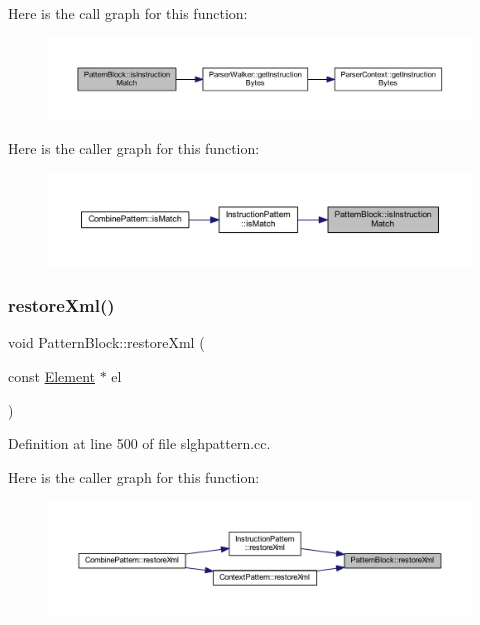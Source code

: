 Here is the call graph for this function\+:
\nopagebreak
\begin{figure}[H]
\begin{center}
\leavevmode
\includegraphics[width=350pt]{class_pattern_block_a64c44360ffff4e4b508d5b1ac0f7b9a2_cgraph}
\end{center}
\end{figure}
Here is the caller graph for this function\+:
\nopagebreak
\begin{figure}[H]
\begin{center}
\leavevmode
\includegraphics[width=350pt]{class_pattern_block_a64c44360ffff4e4b508d5b1ac0f7b9a2_icgraph}
\end{center}
\end{figure}
\mbox{\label{class_pattern_block_aa4465b1b7c1fa2f15d04ac74be36b21f}} 
\subsubsection{\texorpdfstring{restoreXml()}{restoreXml()}}
{\footnotesize\ttfamily void Pattern\+Block\+::restore\+Xml (\begin{DoxyParamCaption}\item[{const \mbox{\hyperlink{class_element}{Element}} $\ast$}]{el }\end{DoxyParamCaption})}



Definition at line 500 of file slghpattern.\+cc.

Here is the caller graph for this function\+:
\nopagebreak
\begin{figure}[H]
\begin{center}
\leavevmode
\includegraphics[width=350pt]{class_pattern_block_aa4465b1b7c1fa2f15d04ac74be36b21f_icgraph}
\end{center}
\end{figure}
\mbox{\label{class_pattern_block_ab0e34b5b191eaa74314a70762f1530fc}} 
